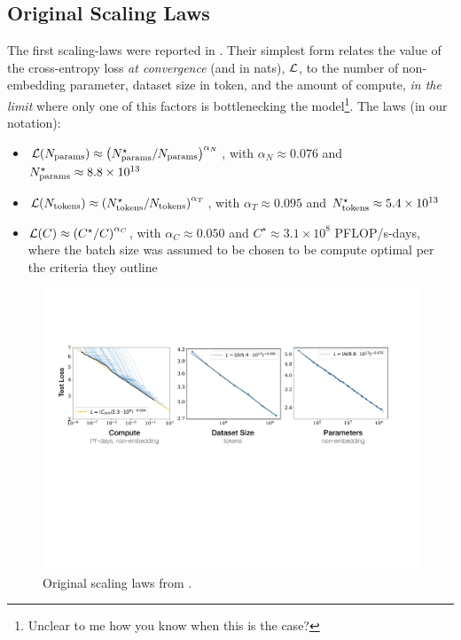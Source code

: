 \documentclass[11pt]{article}
\begin{document}
\subsection{Original Scaling Laws}


The first scaling-laws were reported in \cite{kaplan2020scaling}.   Their simplest form relates the
value of the cross-entropy loss \textit{at convergence} (and in nats), $ \mathcal{L}  $,  to the number of non-embedding
parameter, dataset size in token, and the amount of compute, \textit{in the limit} where only one of
this factors is bottlenecking the model\footnote{Unclear to me how you know when this is the case?}. The laws (in our notation):
\begin{itemize}
	\item $ \mathcal{L} (N _{ {\rm params} }) \approx  \left ( N _{ {\rm  params} }^{ \star } / N _{ {\rm  params}
		      } \right ) ^{ \alpha _{ N } } $, with $ \alpha _{ N } \approx 0.076 $ and $ N _{ {\rm params} } ^{ \star }  \approx
		      8.8\times 10 ^{ 13 }$
	\item $ \mathcal{L} (N _{ {\rm  tokens} }) \approx  \left ( N _{ {\rm tokens}} ^{ \star } / N _{ {\rm  tokens}
		      } \right ) ^{ \alpha _{ T } } $, with $ \alpha _{ T } \approx 0.095 $ and $ N _{{\rm  tokens}  } ^{  \star }  \approx
		      5.4\times 10 ^{ 13 }$
	\item $ \mathcal{L} (C) \approx  \left ( C ^{ \star } /  C
		      \right ) ^{ \alpha _{ C } } $, with $ \alpha _{ C } \approx 0.050  $ and $ C ^{  \star }  \approx
		      3.1\times 10 ^{8} $ PFLOP/s-days, where the batch size was assumed to be chosen to be compute optimal per the criteria they outline
\end{itemize}

\begin{figure}[ht]
	\centering
	\includegraphics[scale=.5]{figures/SimplePowerLaws.pdf}
	\caption{Original scaling laws from \cite{kaplan2020scaling}.}
	\label{fig_scaling_laws_original_1}
\end{figure}
\end{document}
